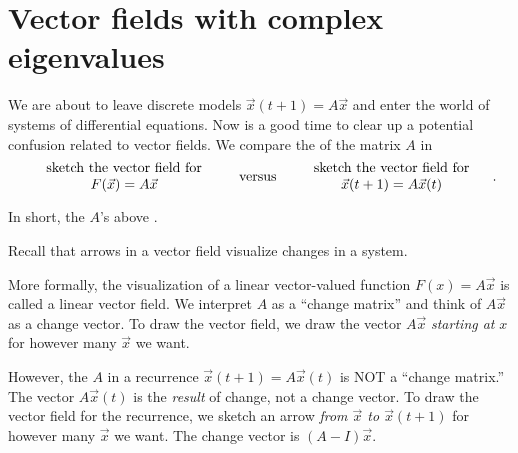 \documentclass[../main.tex]{subfiles}
\begin{document}
\section{Vector fields with complex eigenvalues}

We are about to leave discrete models \(\vec{x}(t+1) = A \vec{x}\) and enter the world of systems of differential equations.  Now is a good time to clear up a potential confusion related to vector fields. We compare the  of the matrix \(A\) in 
\[
  \parbox[c]{2in}{\centering sketch the vector field for \(F(\vec{x}) = A \vec{x}\)} \quad\text{versus}\quad \parbox[c]{2in}{\centering sketch the vector field for \(\vec{x}(t+1) = A \vec{x}(t)\)}.
\]
\medskip

\faExclamationTriangle{} In short, the \(A\)'s above . 

Recall that arrows in a vector field visualize changes in a system. 

More formally, the visualization of a linear vector-valued function \(F(x) = A \vec{x}\) is called a linear vector field.  We interpret \(A\) as a ``change matrix'' and think of \(A \vec{x}\) as a change vector.  To draw the vector field, we draw the vector \(A \vec{x}\) \emph{starting at} \(x\) for however many \(\vec{x}\) we want.

However, the \(A\) in a recurrence \(\vec{x}(t+1) = A \vec{x}(t)\) is NOT a ``change matrix.'' The vector \(A \vec{x}(t)\) is the \emph{result} of change, not a change vector. To draw the vector field for the recurrence, we sketch an arrow \emph{from \(\vec{x}\) to \(\vec{x}(t+1)\)} for however many \(\vec{x}\) we want. The change vector is \((A - I) \vec{x}\).

\bigskip
\end{document}
